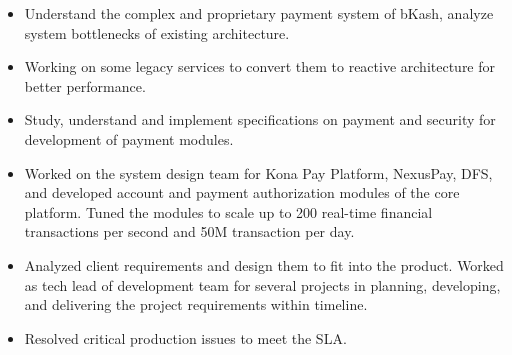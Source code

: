 \documentclass[10pt,a4paper,ragged2e]{altacv}
\begin{document}

  \begin{itemize}
      \item Understand the complex and proprietary payment system of bKash, analyze system bottlenecks of existing architecture.
      \item Working on some legacy services to convert them to reactive architecture for better performance.
  \end{itemize}



  \begin{itemize}
      \item Study, understand and implement specifications on payment and security for development of payment modules.
      \item Worked on the system design team for Kona Pay Platform, NexusPay, DFS, and developed account and payment authorization modules of the core platform. Tuned the modules to scale up to 200 real-time financial transactions per second and 50M transaction per day.
      \item Analyzed client requirements and design them to fit into the product. Worked as tech lead of development team for several projects in planning, developing, and delivering the project requirements within timeline.
      \item Resolved critical production issues to meet the SLA.
  \end{itemize}







\end{document}
